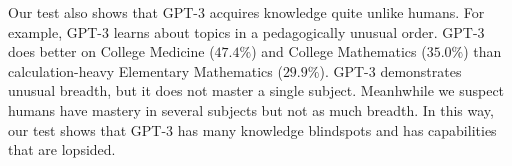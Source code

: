 
Our test also shows that GPT-3 acquires knowledge quite unlike humans. For example, GPT-3 learns about topics in a pedagogically unusual order.
GPT-3 does better on College Medicine ($47.4\%$) and College Mathematics ($35.0\%$) than calculation-heavy Elementary Mathematics ($29.9\%$). GPT-3 demonstrates unusual breadth, but it does not master a single subject. Meanhwhile we suspect humans have mastery in several subjects but not as much breadth. In this way, our test shows that GPT-3 has many knowledge blindspots and has capabilities that are lopsided.






